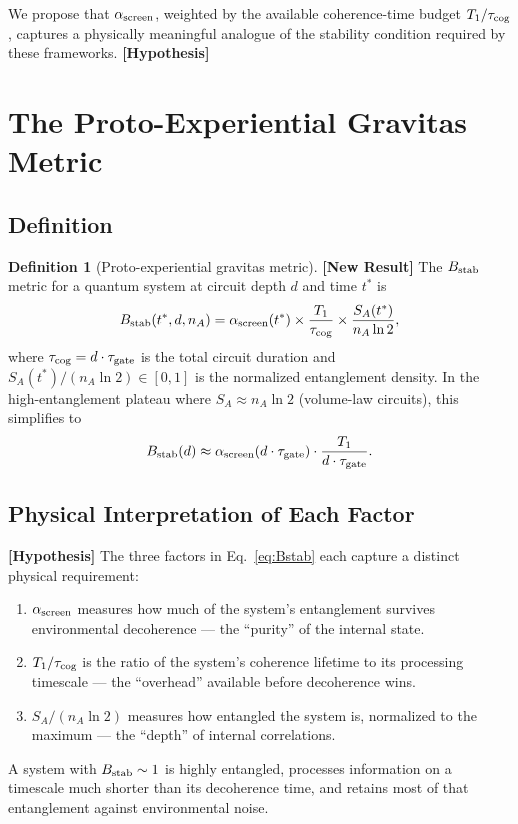 \documentclass[12pt,letterpaper]{article}
\theoremstyle{definition}
\newtheorem{definition}[theorem]{Definition}
\theoremstyle{remark}
\newcommand{\hypothesis}{\textbf{[Hypothesis]}}
\newcommand{\newresult}{\textbf{[New Result]}}
\newcommand{\ascreen}{\alpha_{\rm screen}}
\newcommand{\Bstab}{B_{\rm stab}}
\newcommand{\taugate}{\tau_{\rm gate}}
\newcommand{\taucog}{\tau_{\rm cog}}
\begin{document}
We propose that $\ascreen$, weighted by the available coherence-time budget
$T_1/\taucog$, captures a physically meaningful analogue of the stability condition
required by these frameworks.
\hypothesis{}

\section{The Proto-Experiential Gravitas Metric}
\label{sec:Bstab}

\subsection{Definition}

\begin{definition}[Proto-experiential gravitas metric] \label{def:Bstab}
\newresult{}
The $\Bstab$ metric for a quantum system at circuit depth $d$ and time $t^*$ is
\begin{equation}
\Bstab(t^*, d, n_A)
  = \ascreen(t^*) \times \frac{T_1}{\taucog}
    \times \frac{S_A(t^*)}{n_A \ln 2},
\label{eq:Bstab}
\end{equation}
where $\taucog = d\cdot\taugate$ is the total circuit duration and
$S_A(t^*)/(n_A\ln 2)\in[0,1]$ is the normalized entanglement density.
In the high-entanglement plateau where $S_A \approx n_A\ln 2$ (volume-law circuits),
this simplifies to
\begin{equation}
\Bstab(d) \approx \ascreen(d\cdot\taugate) \cdot \frac{T_1}{d\cdot\taugate}.
\label{eq:BstabSimple}
\end{equation}
\end{definition}

\subsection{Physical Interpretation of Each Factor}

\hypothesis{} The three factors in Eq.~\eqref{eq:Bstab} each capture a distinct
physical requirement:
\begin{enumerate}[noitemsep]
\item $\ascreen$ measures how much of the system's entanglement survives
      environmental decoherence --- the ``purity'' of the internal state.
\item $T_1/\taucog$ is the ratio of the system's coherence lifetime to its
      processing timescale --- the ``overhead'' available before decoherence wins.
\item $S_A/(n_A\ln 2)$ measures how entangled the system is, normalized to the
      maximum --- the ``depth'' of internal correlations.
\end{enumerate}
A system with $\Bstab\sim 1$ is highly entangled, processes information on a timescale
much shorter than its decoherence time, and retains most of that entanglement against
environmental noise.
\end{document}
